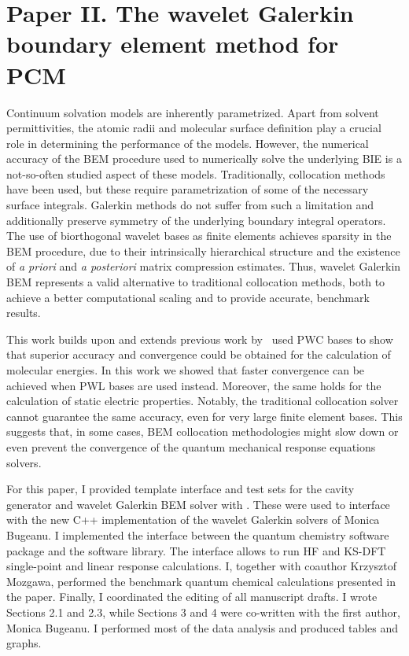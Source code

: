 \section*{Paper II. The wavelet Galerkin boundary element method for PCM}

Continuum solvation models are inherently parametrized. Apart from solvent permittivities,
the atomic radii and molecular surface definition play a crucial role
in determining the performance of the models.
However, the numerical accuracy of the \acs{BEM} procedure used to numerically solve the
underlying \acs{BIE} is a not-so-often studied aspect of these models.
Traditionally, collocation methods have been used, but these require parametrization of some of the necessary surface integrals.
Galerkin methods do not suffer from such a limitation and additionally preserve symmetry of the underlying
boundary integral operators.
The use of biorthogonal wavelet bases as finite elements achieves sparsity in
the \acs{BEM} procedure, due to their intrinsically hierarchical structure and
the existence of \emph{a priori} and \emph{a posteriori} matrix compression
estimates.
Thus, wavelet Galerkin \acs{BEM} represents a valid alternative to traditional
collocation methods, both to achieve a better computational scaling and to
provide accurate, benchmark results.\autocite{Harbrecht2004-uo,
Harbrecht2006-ug, Dahmen2006-pj}

This work builds upon and extends previous work by~\citeauthor{Weijo2010-hy}
\citeauthor{Weijo2010-hy} used \ac{PWC} bases to show that superior accuracy
and convergence could be obtained for the calculation of molecular energies.
In this work we showed that faster convergence can be achieved when \ac{PWL} bases are used instead.
Moreover, the same holds for the calculation of static electric properties.
Notably, the traditional collocation solver cannot guarantee the same accuracy,
even for very large finite element bases. This suggests that, in some cases,
\acs{BEM} collocation methodologies might slow down or even prevent the
convergence of the quantum mechanical response equations solvers.

For this paper, I provided template interface and test sets for the cavity
generator\autocite{Harbrecht2009-no, Harbrecht2011-dk} and wavelet Galerkin
\acs{BEM} solver with \pcmsolver.
These were used to interface with the new C++ implementation of the wavelet
Galerkin solvers of Monica Bugeanu.
I implemented the interface between the \LSDALTON quantum chemistry software
package and the \pcmsolver software library. The interface allows to run \acs{HF} and
\acs{KS}-\acs{DFT} single-point and linear response calculations.
I, together with coauthor Krzysztof Mozgawa, performed the benchmark quantum
chemical calculations presented in the paper.
Finally, I coordinated the editing of all manuscript drafts. I wrote Sections 2.1 and 2.3,
while Sections 3 and 4 were co-written with the first author, Monica Bugeanu.
I performed most of the data analysis and produced tables and graphs.

